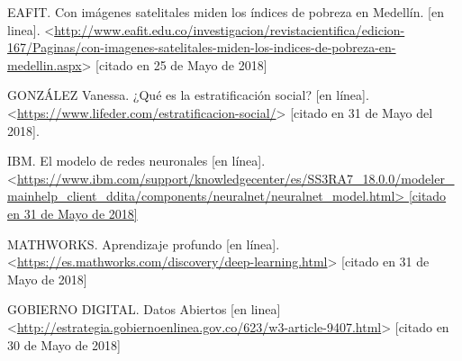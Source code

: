 EAFIT. Con imágenes satelitales miden los índices de pobreza en Medellín. [en linea]. <\url{http://www.eafit.edu.co/investigacion/revistacientifica/edicion-167/Paginas/con-imagenes-satelitales-miden-los-indices-de-pobreza-en-medellin.aspx}> [citado en 25 de Mayo de 2018]

GONZÁLEZ Vanessa. ¿Qué es la estratificación social? [en línea]. <\url{https://www.lifeder.com/estratificacion-social/}> [citado en 31 de Mayo del 2018].

IBM. El modelo de redes neuronales [en línea]. <\url{https://www.ibm.com/support/knowledgecenter/es/SS3RA7_18.0.0/modeler_mainhelp_client_ddita/components/neuralnet/neuralnet_model.html> [citado en 31 de Mayo de 2018]}

MATHWORKS. Aprendizaje profundo [en línea]. <\url{https://es.mathworks.com/discovery/deep-learning.html}> [citado en 31 de Mayo de 2018]

GOBIERNO DIGITAL. Datos Abiertos [en linea] <\url{http://estrategia.gobiernoenlinea.gov.co/623/w3-article-9407.html}> [citado en 30 de Mayo de 2018]

